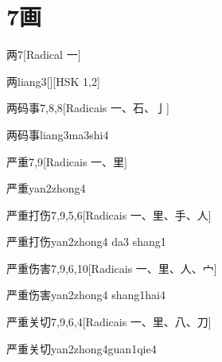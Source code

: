 
\section*{7画}

\begin{entry}{两}{7}[Radical ⼀]
  \begin{phonetics}{两}{liang3}[][HSK 1,2]
  \end{phonetics}
\end{entry}

\begin{entry}{两码事}{7,8,8}[Radicais ⼀、⽯、⼅]
  \begin{phonetics}{两码事}{liang3ma3shi4}
  \end{phonetics}
\end{entry}

\begin{entry}{严重}{7,9}[Radicais ⼀、⾥]
  \begin{phonetics}{严重}{yan2zhong4}
  \end{phonetics}
\end{entry}

\begin{entry}{严重打伤}{7,9,5,6}[Radicais ⼀、⾥、⼿、⼈]
  \begin{phonetics}{严重打伤}{yan2zhong4 da3 shang1}
  \end{phonetics}
\end{entry}

\begin{entry}{严重伤害}{7,9,6,10}[Radicais ⼀、⾥、⼈、⼧]
  \begin{phonetics}{严重伤害}{yan2zhong4 shang1hai4}
  \end{phonetics}
\end{entry}

\begin{entry}{严重关切}{7,9,6,4}[Radicais ⼀、⾥、⼋、⼑]
  \begin{phonetics}{严重关切}{yan2zhong4guan1qie4}
  \end{phonetics}
\end{entry}

